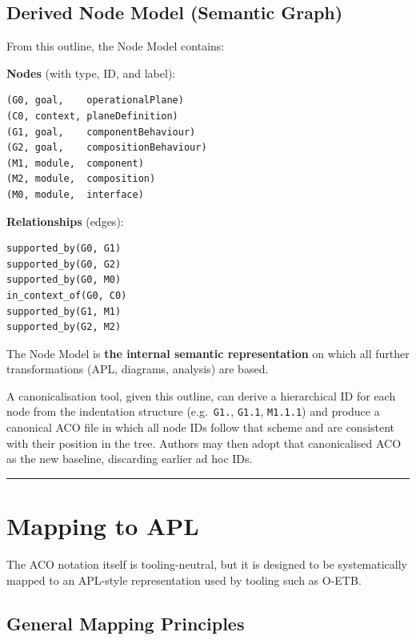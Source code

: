\documentclass[11pt]{article}
\begin{document}
\subsection{Derived Node Model (Semantic Graph)}

From this outline, the Node Model contains:

\textbf{Nodes} (with type, ID, and label):
\begin{verbatim}
(G0, goal,    operationalPlane)
(C0, context, planeDefinition)
(G1, goal,    componentBehaviour)
(G2, goal,    compositionBehaviour)
(M1, module,  component)
(M2, module,  composition)
(M0, module,  interface)
\end{verbatim}

\textbf{Relationships} (edges):
\begin{verbatim}
supported_by(G0, G1)
supported_by(G0, G2)
supported_by(G0, M0)
in_context_of(G0, C0)
supported_by(G1, M1)
supported_by(G2, M2)
\end{verbatim}

The Node Model is \textbf{the internal semantic representation} on which all further transformations (APL, diagrams, analysis) are based.

A canonicalisation tool, given this outline, can derive a hierarchical ID for each node from the indentation structure (e.g.\ \texttt{G1.}, \texttt{G1.1}, \texttt{M1.1.1}) and produce a canonical ACO file in which all node IDs follow that scheme and are consistent with their position in the tree. Authors may then adopt that canonicalised ACO as the new baseline, discarding earlier ad hoc IDs.

\bigskip
\hrule
\bigskip

\section{Mapping to APL}

The ACO notation itself is tooling-neutral, but it is designed to be systematically mapped to an APL-style representation used by tooling such as O-ETB.

\subsection{General Mapping Principles}
\end{document}
